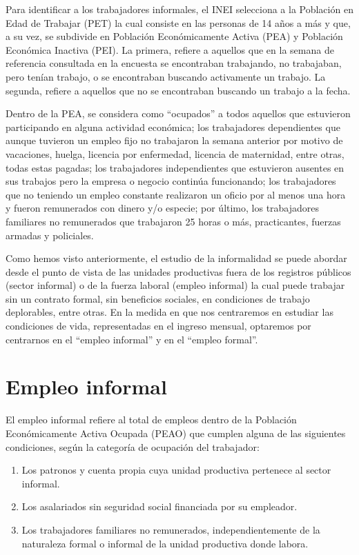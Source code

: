 \documentclass[
  letterpaper,
  12pt,
  oneside,
  spanish,
  doublespacing,
  headsepline,
  parskip]{MastersDoctoralThesis}
\providecommand{\tightlist}{%
  \setlength{\itemsep}{0pt}\setlength{\parskip}{0pt}}\usepackage{longtable,booktabs,array}
\begin{document}
Para identificar a los trabajadores informales, el INEI selecciona a la
Población en Edad de Trabajar (PET) la cual consiste en las personas de
14 años a más y que, a su vez, se subdivide en Población Económicamente
Activa (PEA) y Población Económica Inactiva (PEI). La primera, refiere a
aquellos que en la semana de referencia consultada en la encuesta se
encontraban trabajando, no trabajaban, pero tenían trabajo, o se
encontraban buscando activamente un trabajo. La segunda, refiere a
aquellos que no se encontraban buscando un trabajo a la fecha.

Dentro de la PEA, se considera como ``ocupados'' a todos aquellos que
estuvieron participando en alguna actividad económica; los trabajadores
dependientes que aunque tuvieron un empleo fijo no trabajaron la semana
anterior por motivo de vacaciones, huelga, licencia por enfermedad,
licencia de maternidad, entre otras, todas estas pagadas; los
trabajadores independientes que estuvieron ausentes en sus trabajos pero
la empresa o negocio continúa funcionando; los trabajadores que no
teniendo un empleo constante realizaron un oficio por al menos una hora
y fueron remunerados con dinero y/o especie; por último, los
trabajadores familiares no remunerados que trabajaron 25 horas o más,
practicantes, fuerzas armadas y policiales.

Como hemos visto anteriormente, el estudio de la informalidad se puede
abordar desde el punto de vista de las unidades productivas fuera de los
registros públicos (sector informal) o de la fuerza laboral (empleo
informal) la cual puede trabajar sin un contrato formal, sin beneficios
sociales, en condiciones de trabajo deplorables, entre otras. En la
medida en que nos centraremos en estudiar las condiciones de vida,
representadas en el ingreso mensual, optaremos por centrarnos en el
``empleo informal'' y en el ``empleo formal''.

\hypertarget{empleo-informal}{%
\section{Empleo informal}\label{empleo-informal}}

El empleo informal refiere al total de empleos dentro de la Población
Económicamente Activa Ocupada (PEAO) que cumplen alguna de las
siguientes condiciones, según la categoría de ocupación del trabajador:

\begin{enumerate}
\def\labelenumi{\roman{enumi})}
\tightlist
\item
  Los patronos y cuenta propia cuya unidad productiva pertenece al
  sector informal.
\item
  Los asalariados sin seguridad social financiada por su empleador.
\item
  Los trabajadores familiares no remunerados, independientemente de la
  naturaleza formal o informal de la unidad productiva donde labora.
\end{enumerate}
\end{document}
